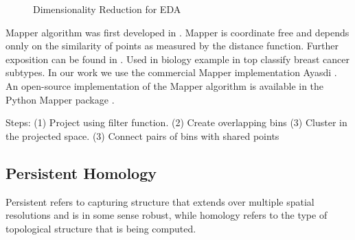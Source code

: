 \begin{figure}
\caption[Dimensionality Reduction for EDA]{Dimensionality Reduction for EDA}
\label{background:fig:eda}
\end{figure}

Mapper algorithm was first developed in \cite{Singh:2007ve}.
Mapper is coordinate free and depends onnly on the similarity of points as measured by the distance function.
Further exposition can be found in \cite{Lum:2013cz}.
Used in biology example in \cite{Nicolau:2011} top classify breast cancer subtypes.
In our work we use the commercial Mapper implementation Ayasdi \cite{AyasdiIris:2015}.
An open-source implementation of the Mapper algorithm is available in the Python Mapper package \cite{Mullner:2013}.

Steps:
(1) Project using filter function.
(2) Create overlapping bins
(3) Cluster in the projected space.
(3) Connect pairs of bins with shared points

\subsection{Persistent Homology}
\label{background:ss:persistent_homology}

Persistent refers to capturing structure that extends over multiple spatial resolutions and is in some sense robust, while homology refers to the type of topological structure that is being computed.

